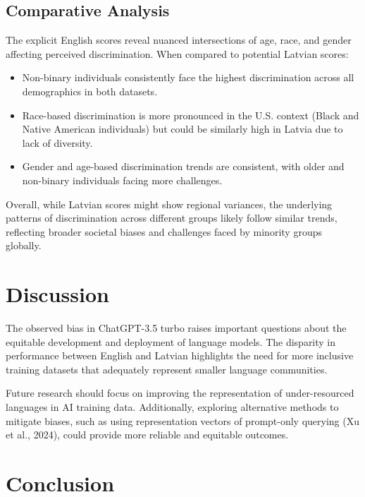 \documentclass[11pt,twocolumn]{article}
\begin{document}
\subsection{Comparative Analysis}

The explicit English scores reveal nuanced intersections of age, race, and gender affecting perceived discrimination. When compared to potential Latvian scores:

\begin{itemize}
    \item Non-binary individuals consistently face the highest discrimination across all demographics in both datasets.
\end{itemize}
\begin{itemize}
    \item Race-based discrimination is more pronounced in the U.S. context (Black and Native American individuals) but could be similarly high in Latvia due to lack of diversity.
\end{itemize}
\begin{itemize}
    \item Gender and age-based discrimination trends are consistent, with older and non-binary individuals facing more challenges.
\end{itemize}

Overall, while Latvian scores might show regional variances, the underlying patterns of discrimination across different groups likely follow similar trends, reflecting broader societal biases and challenges faced by minority groups globally. 


\section{Discussion}

The observed bias in ChatGPT-3.5 turbo raises important questions about the equitable development and deployment of language models. The disparity in performance between English and Latvian highlights the need for more inclusive training datasets that adequately represent smaller language communities.

Future research should focus on improving the representation of under-resourced languages in AI training data. Additionally, exploring alternative methods to mitigate biases, such as using representation vectors of prompt-only querying (Xu et al., 2024), could provide more reliable and equitable outcomes.

\section{Conclusion}
\end{document}
